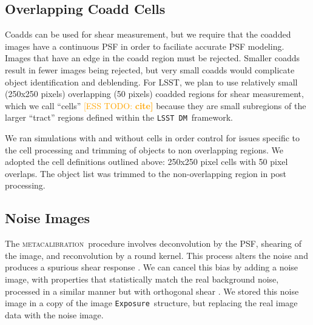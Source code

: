 \documentclass[twocolumn,twocolappendix,astrosym]{openjournal}
\newcommand{\esstodo}[1]{\textcolor{orange}{[ESS TODO: \bf #1]}}
\newcommand{\calexp}{\texttt{Exposure}}
\newcommand{\dm}{\texttt{LSST DM}}
\newcommand{\mcal}{\textsc{metacalibration}}
\begin{document}
\subsection{Overlapping Coadd Cells} \label{sec:sim:cells}

Coadds can be used for shear measurement\citep{ArmstrongCoadd}, but we
require that the coadded images have a continuous PSF in order to faciliate
accurate PSF modeling.  Images that have an edge in the coadd region must be
rejected.  Smaller coadds result in fewer images being rejected, but very small
coadds would complicate object identification and deblending.  For LSST, we plan to
use relatively small (250x250 pixels) overlapping (50 pixels) coadded regions
for shear measurement, which we call ``cells'' \esstodo{cite} because they
are small subregions of the larger ``tract'' regions defined within the
\dm\ framework.

We ran simulations with and without cells in order control for issues specific
to the cell processing and trimming of objects to non overlapping regions.  We
adopted the cell definitions outlined above: 250x250 pixel cells with 50 pixel
overlaps. The object list was trimmed to the non-overlapping region in post
processing.

\subsection{Noise Images} \label{sec:sim:noiseimages}

The \mcal\ procedure involves deconvolution by the PSF, shearing of the image,
and reconvolution by a round kernel.  This process alters the noise and
produces a spurious shear response \citep{SheldonMcal2017}.  We can cancel this
bias by adding a noise image, with properties that statistically match the real
background noise, processed in a similar manner but with orthogonal shear
\citep{SheldonMcal2017,mdet20}.  We stored this noise image in a copy of the image
\calexp\ structure, but replacing the real image data with the noise image.
\end{document}

